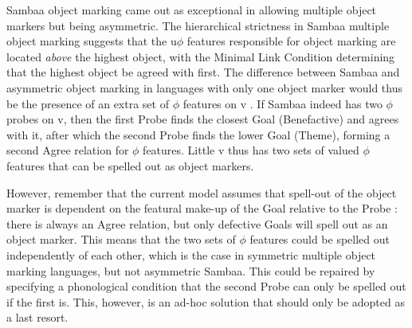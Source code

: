 \documentclass[output=paper
,modfonts
,nonflat]{langsci/langscibook}
\begin{document}
Sambaa object marking came out as exceptional in allowing multiple object markers but being asymmetric. The hierarchical strictness in Sambaa multiple object marking suggests that the u$\phi$ features responsible for object marking are located \textit{above} the highest object, with the Minimal Link Condition determining that the highest object be agreed with first. The difference between Sambaa and asymmetric object marking in languages with only one object marker would thus be the presence of an extra set of $\phi$ features on v \citep{Adams2010}. If Sambaa indeed has two $\phi$ probes on v, then the first Probe finds the closest Goal (Benefactive) and agrees with it, after which the second Probe finds the lower Goal (Theme), forming a second Agree relation for $\phi$ features. Little v thus has two sets of valued $\phi$ features that can be spelled out as object markers.

However, remember that the current model assumes that spell-out of the object marker is dependent on the featural make-up of the Goal relative to the Probe \citep{Roberts2010, Iorio2014, Van_der_Wal2015}: there is always an Agree relation, but only defective Goals will spell out as an object marker. This means that the two sets of $\phi$ features could be spelled out independently of each other, which is the case in symmetric multiple object marking languages, but not asymmetric Sambaa. This could be repaired by specifying a phonological condition that the second Probe can only be spelled out if the first is. This, however, is an ad-hoc solution that should only be adopted as a last resort. 
\end{document}

